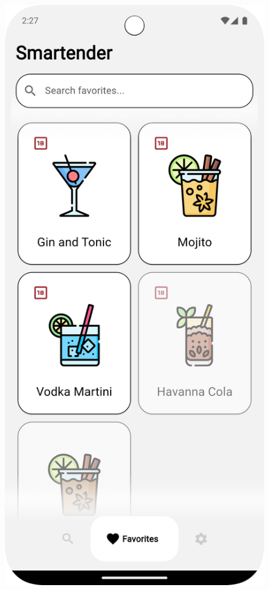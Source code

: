 \begin{figure}[h!]
    \centering
    \begin{minipage}{0.27\textwidth}
        \centering
        \includegraphics[width=\textwidth]{graphics/images/favorites_light.png}

\end{minipage}
\end{figure}
